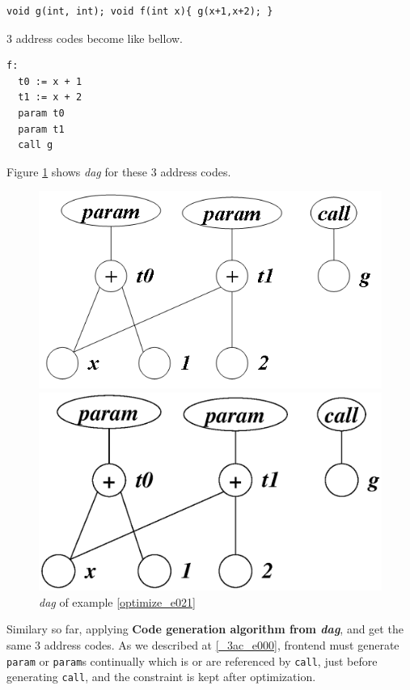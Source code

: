 \begin{Example}
\label{optimize_e021}
\begin{verbatim}
void g(int, int); void f(int x){ g(x+1,x+2); }
\end{verbatim}
3 address codes become like bellow.
\begin{verbatim}
f:
  t0 := x + 1
  t1 := x + 2
  param t0
  param t1
  call g
\end{verbatim}
Figure \ref{optimize_e022} shows {\em dag} for these 3 address codes.
\begin{figure}[htbp]
\begin{center}
\begin{htmlonly}
\includegraphics[width=0.8\linewidth,height=0.470\linewidth]{opt009.png}
\end{htmlonly}
\begin{latexonly}
\includegraphics[width=0.8\linewidth,height=0.470\linewidth]{opt009.eps}
\end{latexonly}
\caption{{\em dag} of example \ref{optimize_e021}}
\label{optimize_e022}
\end{center}
\end{figure}
Similary so far, applying {\bf Code generation algorithm from {\em
 dag}}, and get the same 3 address codes.
As we described at \ref{_3ac_e000}, frontend must 
generate {\tt{param}} or {\tt{param}}s continually
which is or are referenced by {\tt{call}}, just before generating
{\tt{call}}, and the constraint is kept after optimization.
\end{Example}

